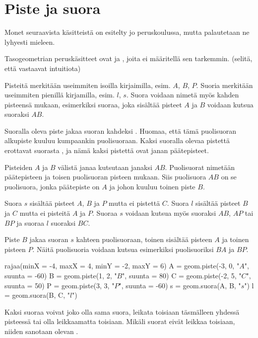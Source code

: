 \section*{Piste ja suora}

Monet seuraavista käsitteistä on esitelty jo peruskoulussa, mutta palautetaan ne lyhyesti
mieleen.

Tasogeometrian peruskäsitteet ovat  ja , joita ei
määritellä sen tarkemmin. (selitä, että vastaavat intuitiota)

Pisteitä merkitään useimmiten isoilla kirjaimilla, esim. $A$, $B$, $P$. Suoria merkitään useimmiten pienillä kirjamilla, esim. $l$, $s$. Suora voidaan nimetä myös kahden pisteensä mukaan, esimerkiksi suoraa, joka sisältää pisteet $A$ ja $B$ voidaan kutsua suoraksi $AB$.

Suoralla oleva piste jakaa suoran kahdeksi . Huomaa, että tämä puolisuoran
alkupiste kuuluu kumpaankin puolisuoraan. Kaksi suoralla olevaa pistettä erottavat suorasta
, ja nämä kaksi pistettä ovat janan päätepisteet.

Pisteiden $A$ ja $B$ välistä janaa kutsutaan janaksi $AB$. Puolisuorat nimetään päätepisteen ja toisen puolisuoran pisteen mukaan. Siis puolisuora $AB$ on se puolisuora, jonka päätepiste on $A$ ja johon kuuluu toinen piste $B$.

\begin{esimerkki}
Suora $s$ sisältää pisteet $A$, $B$ ja $P$ mutta ei pistettä $C$. Suora $l$ sisältää pisteet $B$ ja $C$ mutta ei pisteitä $A$ ja $P$. Suoraa $s$ voidaan kutsua myös suoraksi $AB$, $AP$ tai $BP$ ja suoraa $l$ suoraksi $BC$.

Piste $B$ jakaa suoran $s$ kahteen puolisuoraan, toinen sisältää pisteen $A$ ja toinen pisteen $P$. Näitä puolisuoria voidaan kutsua esimerkiksi puolisuoriksi $BA$ ja $BP$.

\begin{center}
\begin{kuva}
	rajaa(minX = -4, maxX = 4, minY = -2, maxY = 6)
	A = geom.piste(-3, 0, "$A$", suunta = -60)
	B = geom.piste(1, 2, "$B$", suunta = 80)
	C = geom.piste(-2, 5, "$C$", suunta = 50)
	P = geom.piste(3, 3, "$P$", suunta = -60)
	s = geom.suora(A, B, "$s$")
	l = geom.suora(B, C, "$l$")
\end{kuva}
\end{center}
\end{esimerkki}

Kaksi suoraa voivat joko olla sama suora, leikata toisiaan täsmälleen yhdessä pisteessä tai olla leikkaamatta toisiaan. Mikäli suorat eivät leikkaa toisiaan, niiden sanotaan olevan .

